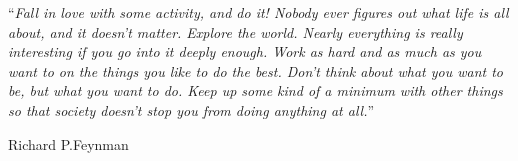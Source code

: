 \cleardoublepage


\vspace*{0.2\textheight}

\noindent\enquote{\itshape Fall in love with some activity, and do it! Nobody ever figures out what life is all about, and it doesn't matter. Explore the world. Nearly everything is really interesting if you go into it deeply enough. Work as hard and as much as you want to on the things you like to do the best. Don't think about what you want to be, but what you want to do. Keep up some kind of a minimum with other things so that society doesn't stop you from doing anything at all.}\bigbreak

\hfill Richard P.Feynman


\begin{abstract}
  \addchaptertocentry{\abstractname} %
  
\end{abstract}


\begin{acknowledgements}
  \addchaptertocentry{\acknowledgementname} %
  
\end{acknowledgements}


\tableofcontents %

\listoffigures %

\listoftables %


